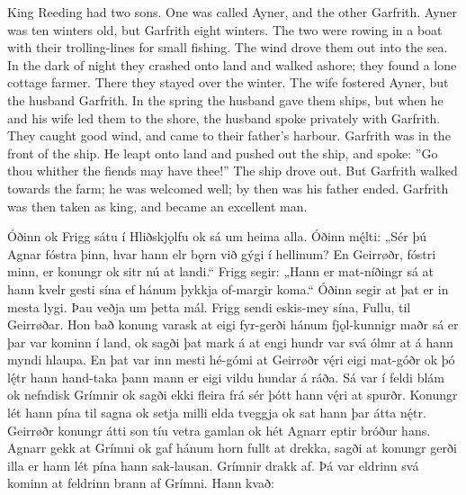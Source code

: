 \bpb King Reeding had two sons. One was called Ayner, and the other Garfrith.
Ayner was ten winters old, but Garfrith eight winters. The two were rowing in a boat with their trolling-lines for small fishing.
The wind drove them out into the sea. In the dark of night they crashed onto land and walked ashore; they found a lone cottage farmer.
There they stayed over the winter. The wife fostered Ayner, but the husband Garfrith.
In the spring the husband gave them ships, but when he and his wife led them to the shore, the husband spoke privately with Garfrith.
They caught good wind, and came to their father’s harbour. Garfrith was in the front of the ship.
He leapt onto land and pushed out the ship, and spoke: ”Go thou whither the fiends may have thee!”
The ship drove out. But Garfrith walked towards the farm; he was welcomed well; by then was his father ended.
Garfrith was then taken as king, and became an excellent man.\epb\epg


\bpg\bpa[1b]Óðinn ok Frigg sátu í Hliðskjǫlfu ok sá um heima alla.
Óðinn mę́lti: „Sér þú Agnar fóstra þinn, hvar hann elr bǫrn við gýgi í hellinum?
En Geirrøðr, fóstri minn, er konungr ok sitr nú at landi.“
Frigg segir: „Hann er mat-níðingr sá at hann kvelr gesti sína ef hánum þykkja of-margir koma.“
Óðinn segir at þat er in mesta lygi. Þau veðja um þetta mál.
Frigg sendi eskis-mey sína, Fullu, til Geirrøðar. Hon bað konung varask at eigi fyr-gerði hánum fjǫl-kunnigr maðr sá er þar var kominn í land, ok sagði þat mark á at engi hundr var svá ólmr at á hann myndi hlaupa.
En þat var inn mesti hé-gómi at Geirrøðr vę́ri eigi mat-góðr ok þó lę́tr hann hand-taka þann mann er eigi vildu hundar á ráða.
Sá var í feldi blám ok nefndisk Grímnir ok sagði ekki fleira frá sér þótt hann vę́ri at spurðr.
Konungr lét hann pína til sagna ok setja milli elda tveggja ok sat hann þar átta nę́tr.
Geirrøðr konungr átti son tíu vetra gamlan ok hét Agnarr eptir bróður hans.
Agnarr gekk at Grímni ok gaf hánum horn fullt at drekka, sagði at konungr gerði illa er hann lét pína hann sak-lausan.
Grímnir drakk af. Þá var eldrinn svá kominn at feldrinn brann af Grímni. Hann kvað:\epa


